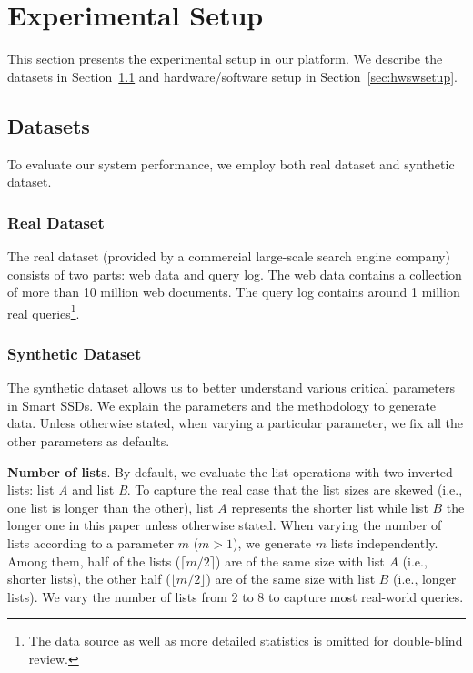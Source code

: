 
\section{Experimental Setup}\label{sec:expSetup}
This section presents the experimental setup in our platform. We describe the datasets in Section~\ref{sec:datasets} and hardware/software setup in Section~\ref{sec:hwswsetup}.

\subsection{Datasets}\label{sec:datasets}
To evaluate our system performance, we employ both real dataset and synthetic dataset.
\subsubsection{Real Dataset}
The real dataset (provided by a commercial large-scale search engine company) consists of two parts: web data and query log. The web data contains a collection of more than 10 million web documents. The query log contains around 1 million real queries\footnote{\small The data source as well as more detailed statistics is omitted for double-blind review.}.

\subsubsection{Synthetic Dataset}
The synthetic dataset allows us to better understand various critical parameters in Smart SSDs.
We explain the parameters and the methodology to generate data.
Unless otherwise stated, when varying a particular parameter, we fix all the other parameters as defaults.



\textbf{Number of lists}. By default, we evaluate the list operations with two inverted lists: list \emph{A} and list \emph{B}. To capture the real case that the list sizes are skewed (i.e., one list is longer than the other), list $A$ represents the shorter list while list $B$ the longer one in this paper unless otherwise stated.
When varying the number of lists according to a parameter $m$ ($m>1$), we generate $m$ lists independently. Among them, half of the lists ($\lceil m/2\rceil$) are of the same size with list $A$ (i.e., shorter lists), the other half ($\lfloor m/2\rfloor$) are of the same size with list $B$ (i.e., longer lists). We vary the number of lists from 2 to 8 to capture most real-world queries.

